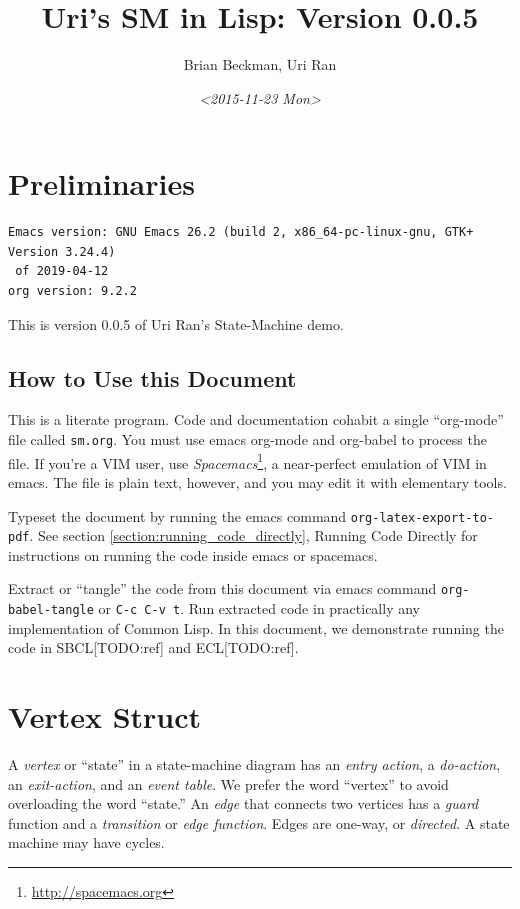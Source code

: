 \documentclass[10pt,oneside,x11names]{article}
\author{Brian Beckman, Uri Ran}
\date{\textit{<2015-11-23 Mon>}}
\title{Uri's SM in Lisp: Version 0.0.5}
\begin{document}
\maketitle
\setcounter{tocdepth}{2}
\tableofcontents


\section{Preliminaries}
\label{sec:org972d939}

\begin{verbatim}
Emacs version: GNU Emacs 26.2 (build 2, x86_64-pc-linux-gnu, GTK+ Version 3.24.4)
 of 2019-04-12
org version: 9.2.2
\end{verbatim}


This is version 0.0.5 of Uri Ran's State-Machine demo.

\subsection{How to Use this Document}
\label{sec:org78b2f78}

This is a literate program. Code and documentation cohabit a single
``org-mode'' file called \texttt{sm.org}. You must use emacs org-mode and org-babel to
process the file. If you're a VIM user, use \emph{Spacemacs}\footnote{\url{http://spacemacs.org}}, a
near-perfect emulation of VIM in emacs. The file is plain text, however, and
you may edit it with elementary tools.

Typeset the document by running the emacs command \texttt{org-latex-export-to-pdf}.
See section \ref{section:running_code_directly}, Running Code Directly for
instructions on running the code inside emacs or spacemacs.

Extract or ``tangle'' the code from this document via emacs command
\texttt{org-babel-tangle} or \texttt{C-c C-v t}. Run extracted code in practically any
implementation of Common Lisp. In this document, we demonstrate running the
code in SBCL[TODO:ref] and ECL[TODO:ref].

\section{Vertex Struct}
\label{sec:org6a6959a}

A \emph{vertex} or ``state'' in a state-machine diagram has an \emph{entry action}, a
\emph{do-action}, an \emph{exit-action}, and an \emph{event table}. We prefer the word
``vertex'' to avoid overloading the word ``state.'' An \emph{edge} that connects two
vertices has a \emph{guard} function and a \emph{transition} or \emph{edge function}. Edges
are one-way, or \emph{directed}. A state machine may have cycles.
\end{document}

